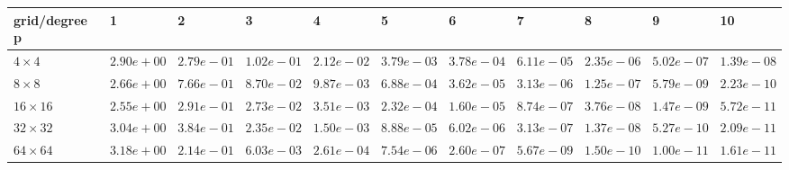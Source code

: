 \begin{tabular}{lllllllllll}
\hline
 grid/degree p   & 1          & 2          & 3          & 4          & 5          & 6          & 7          & 8          & 9          & 10         \\
\hline
 $4 \times 4$    & $2.90e+00$ & $2.79e-01$ & $1.02e-01$ & $2.12e-02$ & $3.79e-03$ & $3.78e-04$ & $6.11e-05$ & $2.35e-06$ & $5.02e-07$ & $1.39e-08$ \\
 $8 \times 8$    & $2.66e+00$ & $7.66e-01$ & $8.70e-02$ & $9.87e-03$ & $6.88e-04$ & $3.62e-05$ & $3.13e-06$ & $1.25e-07$ & $5.79e-09$ & $2.23e-10$ \\
 $16 \times 16$  & $2.55e+00$ & $2.91e-01$ & $2.73e-02$ & $3.51e-03$ & $2.32e-04$ & $1.60e-05$ & $8.74e-07$ & $3.76e-08$ & $1.47e-09$ & $5.72e-11$ \\
 $32 \times 32$  & $3.04e+00$ & $3.84e-01$ & $2.35e-02$ & $1.50e-03$ & $8.88e-05$ & $6.02e-06$ & $3.13e-07$ & $1.37e-08$ & $5.27e-10$ & $2.09e-11$ \\
 $64 \times 64$  & $3.18e+00$ & $2.14e-01$ & $6.03e-03$ & $2.61e-04$ & $7.54e-06$ & $2.60e-07$ & $5.67e-09$ & $1.50e-10$ & $1.00e-11$ & $1.61e-11$ \\
\hline
\end{tabular}